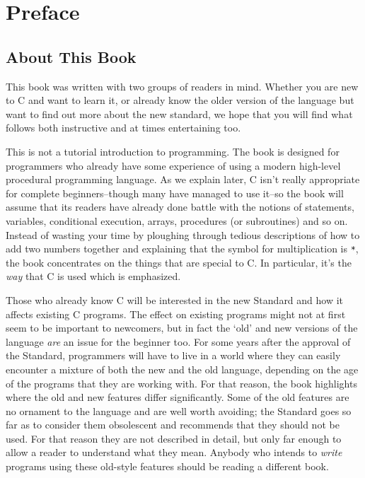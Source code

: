 \chapter*{Preface}


        \section*{About This Book}
        

  

  This book was written with two groups of readers in mind. Whether you are
   new to C and want to learn it, or already know the older version of the
   language but want to find out more about the new standard, we hope that you
   will find what follows both instructive and at times entertaining too.


  This is not a tutorial introduction to programming. The book is designed
   for programmers who already have some experience of using a modern
   high-level procedural programming language. As we explain later,
   C isn't really appropriate for complete beginners--though many
   have managed to use it--so the book will assume that its readers have
   already done battle with the notions of statements, variables, conditional
   execution, arrays, procedures (or subroutines) and so on. Instead of
   wasting your time by ploughing through tedious descriptions of how to add
   two numbers together and explaining that the symbol for multiplication
   is \texttt{*}, the book concentrates on the things that are
   special to C. In particular, it's the \textit{way} that C is used
   which is emphasized.


  Those who already know C will be interested in the new Standard and how
   it affects existing C programs. The effect on existing programs might not
   at first seem to be important to newcomers, but in fact the `old' and
   new versions of the language \textit{are} an issue for the beginner too.
   For some years after the approval of the Standard, programmers will have to
   live in a world where they can easily encounter a mixture of both the new
   and the old language, depending on the age of the programs that they are
   working with. For that reason, the book highlights where the old and new
   features differ significantly. Some of the old features are no ornament to
   the language and are well worth avoiding; the Standard goes so far as to
   consider them obsolescent and recommends that they should not be used. For
   that reason they are not described in detail, but only far enough to allow
   a reader to understand what they mean. Anybody who intends to
   \textit{write} programs using these old-style features should be reading a
   different book.


